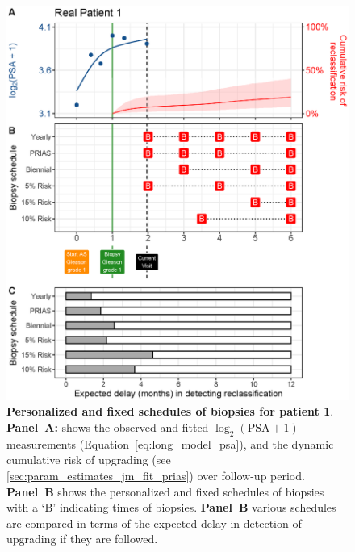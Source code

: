 \begin{figure}
\centerline{\includegraphics[width=\columnwidth]{images/demo_pat1_supp.eps}}
\caption{\textbf{Personalized and fixed schedules of biopsies for patient 1}. \textbf{Panel~A:} shows the observed and fitted $\log_2(\mbox{PSA} + 1)$ measurements (Equation~\ref{eq:long_model_psa}), and the dynamic cumulative risk of upgrading (see \ref{sec:param_estimates_jm_fit_prias}) over follow-up period. \textbf{Panel~B} shows the personalized and fixed schedules of biopsies with a `B' indicating times of biopsies. \textbf{Panel~B} various schedules are compared in terms of the expected delay in detection of upgrading if they are followed.}
\label{fig:demo_pat1_supp}
\end{figure}


